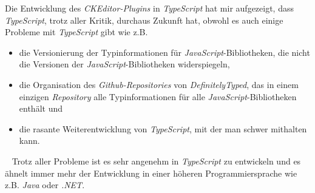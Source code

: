 \newline
\newline
Die Entwicklung des \emph{CKEditor-Plugins} in \emph{TypeScript} hat mir aufgezeigt, dass \emph{TypeScript}, trotz aller Kritik, durchaus Zukunft hat, obwohl es auch einige Probleme mit \emph{TypeScript} gibt wie z.B.
\begin{itemize}
	\item die Versionierung der Typinformationen für \emph{JavaScript}-Bibliotheken, die nicht die Versionen der \emph{JavaScript}-Bibliotheken widerspiegeln,
	\item die Organisation des \emph{Github-Repositories} von \emph{DefinitelyTyped}, das in einem einzigen \emph{Repository} alle Typinformationen für alle \emph{JavaScript}-Bibliotheken enthält und
	\item die rasante Weiterentwicklung von \emph{TypeScript}, mit der man schwer mithalten kann.
\end{itemize}
\ \newline
Trotz aller Probleme ist es sehr angenehm in \emph{TypeScript} zu entwickeln und es ähnelt immer mehr der Entwicklung in einer höheren Programmiersprache wie z.B. \emph{Java} oder \emph{.NET}.